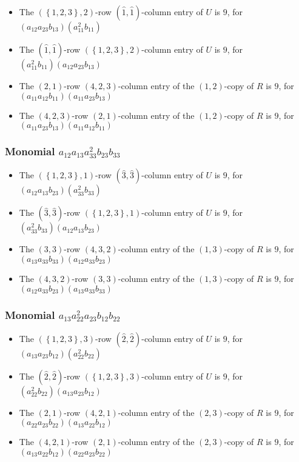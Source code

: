 \documentclass{article}
\begin{document}
\begin{itemize}
\item The $ \left(\left\{1, 2, 3\right\}, 2\right) $-row $ (\hat{1}, \hat{1}) $-column entry of $U$ is $ 9 $, for $( a_{12} a_{23} b_{13} )( a_{11}^{2} b_{11} )$ 
\item The $(\hat{1}, \hat{1})$-row $ \left(\left\{1, 2, 3\right\}, 2\right) $-column entry of $U$ is $ 9 $, for $( a_{11}^{2} b_{11} )( a_{12} a_{23} b_{13} )$ 
\item The $(2, 1)$-row $(4, 2, 3)$-column entry of the $ \left(1, 2\right) $-copy of $R$ is $ 9 $, for $( a_{11} a_{12} b_{11} )( a_{11} a_{23} b_{13} )$ 
\item The $(4, 2, 3)$-row $(2, 1)$-column entry of the $ \left(1, 2\right) $-copy of $R$ is $ 9 $, for $( a_{11} a_{23} b_{13} )( a_{11} a_{12} b_{11} )$ 
\end{itemize}
\subsubsection{Monomial $ a_{12} a_{13} a_{33}^{2} b_{23} b_{33} $}

\begin{itemize}
\item The $ \left(\left\{1, 2, 3\right\}, 1\right) $-row $ (\hat{3}, \hat{3}) $-column entry of $U$ is $ 9 $, for $( a_{12} a_{13} b_{23} )( a_{33}^{2} b_{33} )$ 
\item The $(\hat{3}, \hat{3})$-row $ \left(\left\{1, 2, 3\right\}, 1\right) $-column entry of $U$ is $ 9 $, for $( a_{33}^{2} b_{33} )( a_{12} a_{13} b_{23} )$ 
\item The $(3, 3)$-row $(4, 3, 2)$-column entry of the $ \left(1, 3\right) $-copy of $R$ is $ 9 $, for $( a_{13} a_{33} b_{33} )( a_{12} a_{33} b_{23} )$ 
\item The $(4, 3, 2)$-row $(3, 3)$-column entry of the $ \left(1, 3\right) $-copy of $R$ is $ 9 $, for $( a_{12} a_{33} b_{23} )( a_{13} a_{33} b_{33} )$ 
\end{itemize}
\subsubsection{Monomial $ a_{13} a_{22}^{2} a_{23} b_{12} b_{22} $}

\begin{itemize}
\item The $ \left(\left\{1, 2, 3\right\}, 3\right) $-row $ (\hat{2}, \hat{2}) $-column entry of $U$ is $ 9 $, for $( a_{13} a_{23} b_{12} )( a_{22}^{2} b_{22} )$ 
\item The $(\hat{2}, \hat{2})$-row $ \left(\left\{1, 2, 3\right\}, 3\right) $-column entry of $U$ is $ 9 $, for $( a_{22}^{2} b_{22} )( a_{13} a_{23} b_{12} )$ 
\item The $(2, 1)$-row $(4, 2, 1)$-column entry of the $ \left(2, 3\right) $-copy of $R$ is $ 9 $, for $( a_{22} a_{23} b_{22} )( a_{13} a_{22} b_{12} )$ 
\item The $(4, 2, 1)$-row $(2, 1)$-column entry of the $ \left(2, 3\right) $-copy of $R$ is $ 9 $, for $( a_{13} a_{22} b_{12} )( a_{22} a_{23} b_{22} )$ 
\end{itemize}
\end{document}
